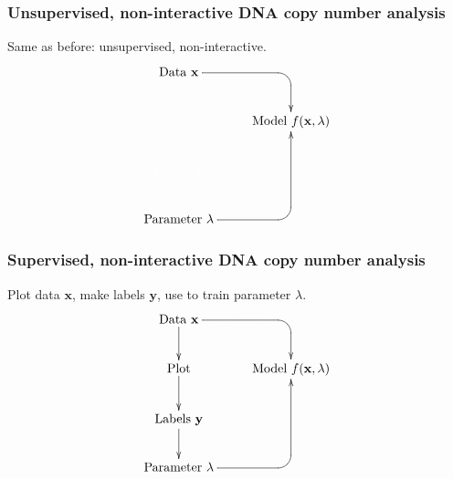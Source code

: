 \documentclass{beamer}
\begin{document}
\begin{frame}
  \frametitle{Unsupervised, non-interactive DNA copy number analysis}
  Same as before: unsupervised, non-interactive.
  \begin{displaymath}
  \xymatrix{
    \text{Data $\mathbf x$}
    \ar `[r] [dr] 
    & \text{ }
    \\
    \color{white}{\text{Plot} }
    & 
    \text{Model $f(\mathbf x, \lambda)$} 
    \\
    \color{white}{\text{Labels $\mathbf y$}       }
    \\
    \text{Parameter $\lambda$} 
    \ar `r[ruu] [ruu]
    & \text{ }
  }
  \end{displaymath}
\end{frame}

\begin{frame}
  \frametitle{Supervised, non-interactive DNA copy number analysis}
  Plot data $\mathbf x$, make labels $\mathbf y$, use to train
  parameter $\lambda$.
  \begin{displaymath}
  \xymatrix{
    \text{Data $\mathbf x$}
    \ar `[r] [dr] 
    \ar [d]
    & \text{ }
    \\
    \text{Plot} 
    \ar [d]
    & 
    \text{Model $f(\mathbf x, \lambda)$} 
    \\
    \text{Labels $\mathbf y$}       
    \ar [d]
    \\
    \text{Parameter $\lambda$} 
    \ar `r[ruu] [ruu]
    & \text{ }
  }
  \end{displaymath}
\end{frame}
\end{document}
